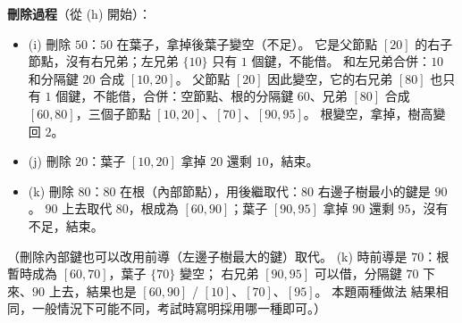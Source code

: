 \begin{pastsoln}
\textbf{刪除過程}（從 (h) 開始）：
\begin{center}
\end{center}
\begin{itemize}
\item (i) 刪除 $50$：$50$ 在葉子，拿掉後葉子變空（不足）。 它是父節點 $[20]$ 的右子節點，沒有右兄弟；左兄弟 $\{10\}$ 只有
$1$ 個鍵，不能借。 和左兄弟合併：$10$ 和分隔鍵 $20$ 合成 $[10, 20]$。 父節點 $[20]$ 因此變空，它的右兄弟 $[80]$ 也只有
$1$ 個鍵，不能借，合併：空節點、根的分隔鍵 $60$、兄弟 $[80]$ 合成 $[60, 80]$，三個子節點 $[10, 20]$、$[70]$、$[90, 95]$。
根變空，拿掉，樹高變回 $2$。
\item (j) 刪除 $20$：葉子 $[10, 20]$ 拿掉 $20$ 還剩 $10$，結束。
\item (k) 刪除 $80$：$80$ 在根（內部節點），用後繼取代：$80$ 右邊子樹最小的鍵是 $90$。 $90$ 上去取代 $80$，根成為
$[60, 90]$；葉子 $[90, 95]$ 拿掉 $90$ 還剩 $95$，沒有不足，結束。
\end{itemize}
（刪除內部鍵也可以改用前導（左邊子樹最大的鍵）取代。 (k) 時前導是 $70$：根暫時成為 $[60, 70]$，葉子 $\{70\}$ 變空；
右兄弟 $[90, 95]$ 可以借，分隔鍵 $70$ 下來、$90$ 上去，結果也是 $[60, 90]$ / $[10]$、$[70]$、$[95]$。 本題兩種做法
結果相同，一般情況下可能不同，考試時寫明採用哪一種即可。）
\end{pastsoln}
